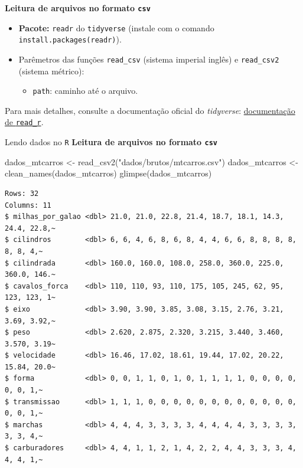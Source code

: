 \documentclass[
  10pt,
  ignorenonframetext,
]{beamer}
\newenvironment{Shaded}{\begin{snugshade}}{\end{snugshade}}
\newcommand{\FunctionTok}[1]{\textcolor[rgb]{0.28,0.35,0.67}{#1}}
\newcommand{\NormalTok}[1]{\textcolor[rgb]{0.00,0.23,0.31}{#1}}
\newcommand{\OtherTok}[1]{\textcolor[rgb]{0.00,0.23,0.31}{#1}}
\newcommand{\StringTok}[1]{\textcolor[rgb]{0.13,0.47,0.30}{#1}}
\providecommand{\tightlist}{%
  \setlength{\itemsep}{0pt}\setlength{\parskip}{0pt}}\usepackage{longtable,booktabs,array}
\begin{document}
\begin{frame}[fragile]
\textbf{Leitura de arquivos no formato \texttt{csv}}

\begin{itemize}
\tightlist
\item
  \textbf{Pacote:} \texttt{readr} do \texttt{tidyverse} (instale com o
  comando
  \texttt{install.packages(\textquotesingle{}readr\textquotesingle{})}).
\item
  Parêmetros das funções \texttt{read\_csv} (sistema imperial inglês) e
  \texttt{read\_csv2} (sistema métrico):

  \begin{itemize}
  \tightlist
  \item
    \texttt{path}: caminho até o arquivo.
  \end{itemize}
\end{itemize}

Para mais detalhes, consulte a documentação oficial do \emph{tidyverse}:
\href{https://readr.tidyverse.org}{documentação de \texttt{read\_r}}.
\end{frame}

\begin{frame}[fragile]{Lendo dados no \texttt{R}}
\protect\hypertarget{lendo-dados-no-r-3}{}
\textbf{Leitura de arquivos no formato \texttt{csv}}

\scriptsize

\begin{Shaded}
\begin{Highlighting}[]
\NormalTok{dados\_mtcarros }\OtherTok{\textless{}{-}} \FunctionTok{read\_csv2}\NormalTok{(}\StringTok{"dados/brutos/mtcarros.csv"}\NormalTok{)}
\NormalTok{dados\_mtcarros }\OtherTok{\textless{}{-}} \FunctionTok{clean\_names}\NormalTok{(dados\_mtcarros)}
\FunctionTok{glimpse}\NormalTok{(dados\_mtcarros)}
\end{Highlighting}
\end{Shaded}

\begin{verbatim}
Rows: 32
Columns: 11
$ milhas_por_galao <dbl> 21.0, 21.0, 22.8, 21.4, 18.7, 18.1, 14.3, 24.4, 22.8,~
$ cilindros        <dbl> 6, 6, 4, 6, 8, 6, 8, 4, 4, 6, 6, 8, 8, 8, 8, 8, 8, 4,~
$ cilindrada       <dbl> 160.0, 160.0, 108.0, 258.0, 360.0, 225.0, 360.0, 146.~
$ cavalos_forca    <dbl> 110, 110, 93, 110, 175, 105, 245, 62, 95, 123, 123, 1~
$ eixo             <dbl> 3.90, 3.90, 3.85, 3.08, 3.15, 2.76, 3.21, 3.69, 3.92,~
$ peso             <dbl> 2.620, 2.875, 2.320, 3.215, 3.440, 3.460, 3.570, 3.19~
$ velocidade       <dbl> 16.46, 17.02, 18.61, 19.44, 17.02, 20.22, 15.84, 20.0~
$ forma            <dbl> 0, 0, 1, 1, 0, 1, 0, 1, 1, 1, 1, 0, 0, 0, 0, 0, 0, 1,~
$ transmissao      <dbl> 1, 1, 1, 0, 0, 0, 0, 0, 0, 0, 0, 0, 0, 0, 0, 0, 0, 1,~
$ marchas          <dbl> 4, 4, 4, 3, 3, 3, 3, 4, 4, 4, 4, 3, 3, 3, 3, 3, 3, 4,~
$ carburadores     <dbl> 4, 4, 1, 1, 2, 1, 4, 2, 2, 4, 4, 3, 3, 3, 4, 4, 4, 1,~
\end{verbatim}

\normalsize
\end{frame}
\end{document}
